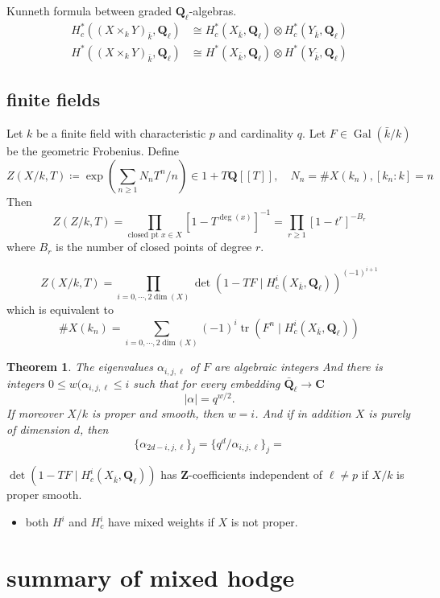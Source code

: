 \documentclass[leqno]{amsart}
\DeclareMathOperator{\mtr}{tr}
\newcommand{\Q}{{\mathbf{Q}}}
\newcommand{\Z}{{\mathbf{Z}}}
\newcommand{\Ql}{\mathbf{Q}_\ell}
\newcommand{\C}{\mathbf C}
\DeclareMathOperator{\Gal}{Gal}
\newcommand{\1}{\mathbf{1}}
\newtheorem{thm}{Theorem}[section]
\theoremstyle{definition}
\theoremstyle{remark}
\begin{document}
Kunneth formula between graded $\Ql$-algebras.
\begin{align*}
	H^*_c((X\times_kY)_{\bar{k}},\Ql)&\cong 
	H^*_c(X_{\bar{k}},\Ql)\otimes H^*_c(Y_{\bar{k}},\Ql)\\
	H^*((X\times_kY)_{\bar{k}},\Ql)&\cong 
	H^*(X_{\bar{k}},\Ql)\otimes H^*(Y_{\bar{k}},\Ql)
\end{align*}


\subsection{finite fields}
Let $k$ be a finite field with
characteristic  $p$ and
cardinality  $q$.
Let  $F\in \Gal(\bar{k}/k)$ be the geometric Frobenius.
Define
\[
	Z(X/k,T)\coloneqq
	\exp\left( \sum_{n\geq 1}N_nT^n/n \right)\in
	1+T\Q[[T]],\quad
	N_n=\#X(k_n), [k_n:k]=n
\]
Then 
\[
	Z(Z/k,T)=\prod_{\text{closed pt }x\in X}
	[1-T^{\deg(x)}]^{-1}
	=\prod_{r\geq1}[1-t^r]^{-B_r}
\]
where $B_r$ is the number of closed points
of degree  $r$.

\[
	Z(X/k,T)=
	\prod_{i=0,\cdots,2\dim(X)}
	\det(1-TF\mid H^i_c(X_{\bar{k}},\Ql))^{(-1)^{i+1}}
\]
which is equivalent to 
\[
	\#X(k_n)=
	\sum_{i=0,\cdots,2\dim(X)}
	(-1)^i\mtr(F^n\mid H^i_c(X_{\bar{k}},\Ql))
\]

\begin{thm}
	The eigenvalues $\alpha_{i,j,\ell}$
	of $F$ are algebraic integers
	And there is integers
	$0\leq w(\alpha_{i,j,\ell}\leq i$
	such that for every embedding $ \bar{\Q}_\ell\to \C$
	\[
		|\alpha|=q^{w/2}.
	\]
	If moreover $X/k$ is proper and smooth,
	then  $w=i$.
	And if in addition  $X$ is purely of dimension  $d$,
	then
	 \[
		\{\alpha_{2d-i,j,\ell}\}_j=
		\{q^d/\alpha_{i,j,\ell}\}_j=
	\]
\end{thm}
$ \det(1-TF\mid H^i_c(X_{\bar{k}},\Ql))$
has $\Z$-coefficients independent of  $\ell\neq p$
if  $X/k$ is proper smooth.

\begin{itemize}
	\item both $H^i$ and  $H^i_c$ have mixed weights
		if  $X$ is not proper.
\end{itemize}

\section{summary of mixed hodge}
\end{document}
